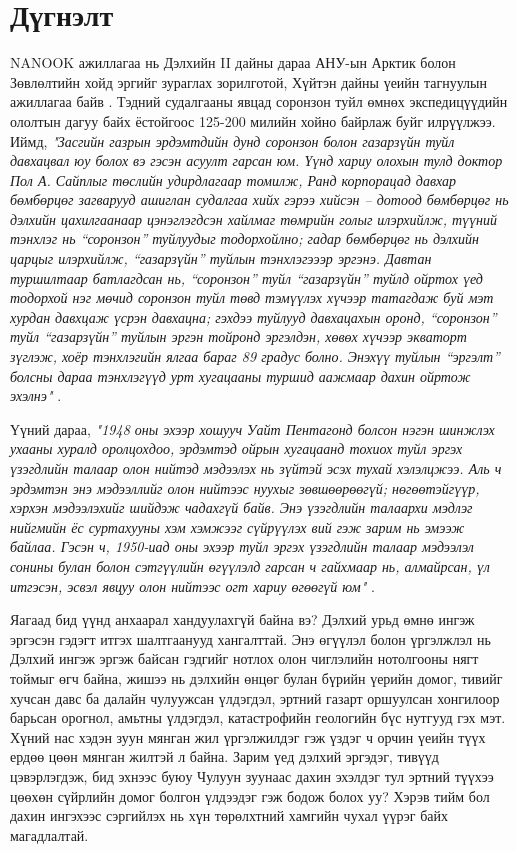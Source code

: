 \documentclass[10pt,twocolumn,letterpaper]{article}
\begin{document}
\section{Дүгнэлт}

NANOOK ажиллагаа нь Дэлхийн II дайны дараа АНУ-ын Арктик болон Зөвлөлтийн хойд эргийг зураглах зорилготой, Хүйтэн дайны үеийн тагнуулын ажиллагаа байв \cite{137}. Тэдний судалгааны явцад соронзон туйл өмнөх экспедицүүдийн ололтын дагуу байх ёстойгоос 125-200 милийн хойно байрлаж буйг илрүүлжээ. Иймд, \textit{"Засгийн газрын эрдэмтдийн дунд соронзон болон газарзүйн туйл давхацвал юу болох вэ гэсэн асуулт гарсан юм. Үүнд хариу олохын тулд доктор Пол А. Сайплыг төслийн удирдлагаар томилж, Ранд корпорацад давхар бөмбөрцөг загварууд ашиглан судалгаа хийх гэрээ хийсэн – дотоод бөмбөрцөг нь дэлхийн цахилгаанаар цэнэглэгдсэн хайлмаг төмрийн голыг илэрхийлж, түүний тэнхлэг нь “соронзон” туйлуудыг тодорхойлно; гадар бөмбөрцөг нь дэлхийн царцыг илэрхийлж, “газарзүйн” туйлын тэнхлэгэээр эргэнэ. Давтан туршилтаар батлагдсан нь, “соронзон” туйл “газарзүйн” туйлд ойртох үед тодорхой нэг мөчид соронзон туйл төвд тэмүүлэх хүчээр татагдаж буй мэт хурдан давхцаж үсрэн давхацна; гэхдээ туйлууд давхацахын оронд, “соронзон” туйл “газарзүйн” туйлын эргэн тойронд эргэлдэн, хөвөх хүчээр экваторт зүглэж, хоёр тэнхлэгийн ялгаа бараг 89 градус болно. Энэхүү туйлын “эргэлт” болсны дараа тэнхлэгүүд урт хугацааны туршид аажмаар дахин ойртож эхэлнэ"} \cite{138,139}.

Үүний дараа, \textit{"1948 оны эхээр хошууч Уайт Пентагонд болсон нэгэн шинжлэх ухааны хуралд оролцохдоо, эрдэмтэд ойрын хугацаанд тохиох туйл эргэх үзэгдлийн талаар олон нийтэд мэдээлэх нь зүйтэй эсэх тухай хэлэлцжээ. Аль ч эрдэмтэн энэ мэдээллийг олон нийтээс нуухыг зөвшөөрөөгүй; нөгөөтэйгүүр, хэрхэн мэдээлэхийг шийдэж чадахгүй байв. Энэ үзэгдлийн талаархи мэдлэг нийгмийн ёс суртахууны хэм хэмжээг сүйрүүлэх вий гэж зарим нь эмээж байлаа. Гэсэн ч, 1950-иад оны эхээр туйл эргэх үзэгдлийн талаар мэдээлэл сонины булан болон сэтгүүлийн өгүүлэлд гарсан ч гайхмаар нь, алмайрсан, үл итгэсэн, эсвэл явцуу олон нийтээс огт хариу өгөөгүй юм"} \cite{138,139}.

Яагаад бид үүнд анхаарал хандуулахгүй байна вэ? Дэлхий урьд өмнө ингэж эргэсэн гэдэгт итгэх шалтгаанууд хангалттай. Энэ өгүүлэл болон үргэлжлэл нь Дэлхий ингэж эргэж байсан гэдгийг нотлох олон чиглэлийн нотолгооны нягт тоймыг өгч байна, жишээ нь дэлхийн өнцөг булан бүрийн үерийн домог, тивийг хучсан давс ба далайн чулуужсан үлдэгдэл, эртний газарт оршуулсан хонгилоор барьсан орогнол, амьтны үлдэгдэл, катастрофийн геологийн бүс нутгууд гэх мэт. Хүний нас хэдэн зуун мянган жил үргэлжилдэг гэж үздэг ч орчин үеийн түүх ердөө цөөн мянган жилтэй л байна. Зарим үед дэлхий эргэдэг, тивүүд цэвэрлэгдэж, бид эхнээс буюу Чулуун зуунаас дахин эхэлдэг тул эртний түүхээ цөөхөн сүйрлийн домог болгон үлдээдэг гэж бодож болох уу? Хэрэв тийм бол дахин ингэхээс сэргийлэх нь хүн төрөлхтний хамгийн чухал үүрэг байх магадлалтай.
\end{document}
